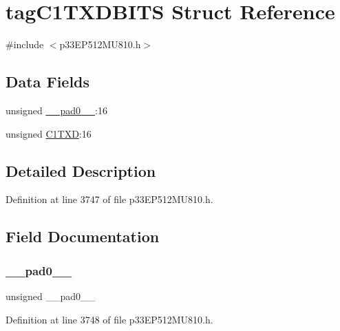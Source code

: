 \hypertarget{structtag_c1_t_x_d_b_i_t_s}{}\section{tag\+C1\+T\+X\+D\+B\+I\+TS Struct Reference}
\label{structtag_c1_t_x_d_b_i_t_s}


{\ttfamily \#include $<$p33\+E\+P512\+M\+U810.\+h$>$}

\subsection*{Data Fields}
\begin{DoxyCompactItemize}
\item 
unsigned \hyperlink{structtag_c1_t_x_d_b_i_t_s_adf71f3d8410c1f1dbbc96680a92c49af}{\+\_\+\+\_\+pad0\+\_\+\+\_\+}\+:16
\item 
unsigned \hyperlink{structtag_c1_t_x_d_b_i_t_s_a3fdcb1581ddac37804eb73ff225fe456}{C1\+T\+XD}\+:16
\end{DoxyCompactItemize}


\subsection{Detailed Description}


Definition at line 3747 of file p33\+E\+P512\+M\+U810.\+h.



\subsection{Field Documentation}
\mbox{\label{structtag_c1_t_x_d_b_i_t_s_adf71f3d8410c1f1dbbc96680a92c49af}} 
\subsubsection{\texorpdfstring{\+\_\+\+\_\+pad0\+\_\+\+\_\+}{\_\_pad0\_\_}}
{\footnotesize\ttfamily unsigned \+\_\+\+\_\+pad0\+\_\+\+\_\+}



Definition at line 3748 of file p33\+E\+P512\+M\+U810.\+h.

